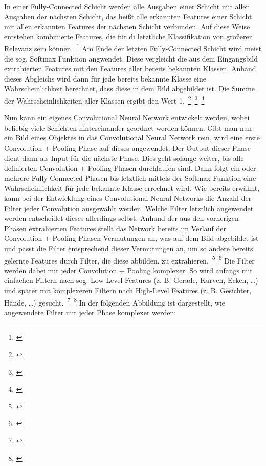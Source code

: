 In einer Fully-Connected Schicht werden alle Ausgaben einer Schicht mit allen Ausgaben der nächsten Schicht, das heißt alle erkannten Features einer Schicht mit allen erkannten Features der nächsten Schicht verbunden. Auf diese Weise entstehen kombinierte Features, die für di letztliche Klassifikation von größerer Relevanz sein können.~\footnote{\cite{ujjwalkarn.2016}} Am Ende der letzten Fully-Connected Schicht wird meist die sog. Softmax Funktion angwendet. Diese vergleicht die aus dem Eingangsbild extrahierten Features mit den Features aller bereits bekannten Klassen. Anhand dieses Abgleichs wird dann für jede bereits bekannte Klasse eine Wahrscheinlichkeit berechnet, dass diese in dem Bild abgebildet ist. Die Summe der Wahrscheinlichkeiten aller Klassen ergibt den Wert 1.~\footnote{\cite[S.~14--15]{Brinkmann.2017}}~\footnote{\cite{ujjwalkarn.2016}}~\footnote{\cite{TensorFlow.2018b}}   

Nun kann ein eigenes Convolutional Neural Network entwickelt werden, wobei beliebig viele Schichten hintereinander geordnet werden können. Gibt man nun ein Bild eines Objektes in das Convolutional Neural Network rein, wird eine erste Convolution + Pooling Phase auf dieses angewendet. Der Output dieser Phase dient dann als Input für die nächste Phase. Dies geht solange weiter, bis alle definierten Convolution + Pooling Phasen durchlaufen sind. Dann folgt ein oder mehrere Fully Connected Phasen bis letztlich mittels der Softmax Funktion eine Wahrscheinlichkeit für jede bekannte Klasse errechnet wird. Wie bereits erwähnt, kann bei der Entwicklung eines Convolutional Neural Networks die Anzahl der Filter jeder Convolution ausgewählt werden. Welche Filter letztlich angewendet werden entscheidet dieses allerdings selbst. Anhand der aus den vorherigen Phasen extrahierten Features stellt das Network bereits im Verlauf der Convolution + Pooling Phasen Vermutungen an, was auf dem Bild abgebildet ist und passt die Filter entsprechend dieser Vermutungen an, um so andere bereits gelernte Features durch Filter, die diese abbilden, zu extrahieren.~\footnote{\cite{ujjwalkarn.2016}}~\footnote{\cite[S.~90--91]{HabibiAghdam.2017}} Die Filter werden dabei mit jeder Convolution + Pooling komplexer. So wird anfangs mit einfachen Filtern nach sog. Low-Level Features (z. B. Gerade, Kurven, Ecken, …) und später mit komplexeren Filtern nach High-Level Features (z. B. Gesichter, Hände, …) gesucht.~\footnote{\cite[S.~95]{Takarli.2016}}~\footnote{\cite{ujjwalkarn.2016}} In der folgenden Abbildung ist dargestellt, wie angewendete Filter mit jeder Phase komplexer werden:

